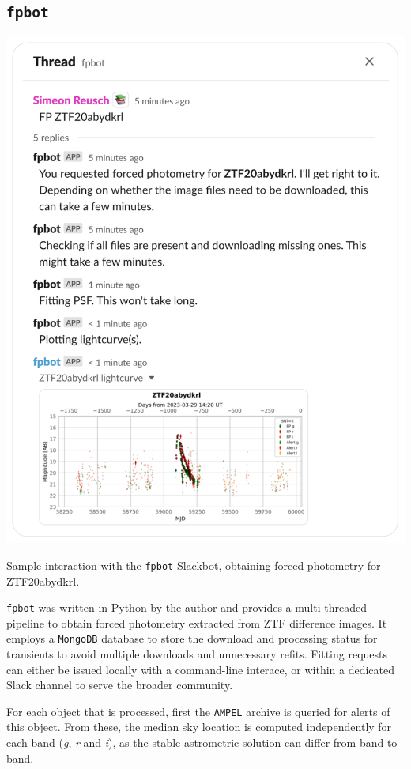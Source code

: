 \documentclass[
    a4paper, %
    fontsize=10pt, %
    twoside=true, %
    numbers=noenddot, %
    fontmethod=tex,
]{kaobook}
\begin{document}
\subsection{\texttt{fpbot}}
\begin{marginfigure}
    \includegraphics{fu/fpbot_slack_border.pdf}
    \caption[\texttt{fpbot} Slackbot interaction]{Sample interaction with the \texttt{fpbot} Slackbot, obtaining forced photometry for ZTF20abydkrl.}
\end{marginfigure} 
\texttt{fpbot} was written in Python by the author and provides a multi-threaded pipeline to obtain forced photometry extracted from ZTF difference images. It employs a \texttt{MongoDB} database to store the download and processing status for transients to avoid multiple downloads and unnecessary refits. Fitting requests can either be issued locally with a command-line interace, or within a dedicated Slack channel to serve the broader community.

For each object that is processed, first the \texttt{AMPEL} archive is queried for alerts of this object. From these, the median sky location is computed independently for each band (\textit{g}, \textit{r} and \textit{i}), as the stable astrometric solution can differ from band to band.
\end{document}
